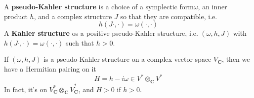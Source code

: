 \documentclass[
11pt, %
letterpaper， %
oneside, %
headinclude,footinclude, %
BCOR5mm, %
]{scrartcl}
\newcommand{\C}{{\mathbf{C}}}
\newcommand{\bfs}{\textbf}
\begin{document}
\begin{definition}
	A \bfs{pseudo-Kahler structure} is a choice of a symplectic form$\omega$, an inner product $h$, and a complex structure $J$ so that they are compatible, i.e.
	\begin{equation*}
	 h(J\cdot, \cdot)=\omega(\cdot,\cdot)
	\end{equation*}
	A \bfs{Kahler structure} os a positive pseudo-Kahler structure, i.e. $(\omega, h, J)$ with $h(J\cdot, \cdot)=\omega(\cdot,\cdot)$ such that $h>0$.
\end{definition}

\begin{rem}
	If $(\omega, h, J)$ is a pseudo-Kahler structure on a complex vector space $V_{\C}$, then we have a Hermitian pairing on it
	\begin{equation*}
	H=h-i\omega \in V^*\otimes_{\C}V^*
	\end{equation*}
	In fact, it's on $V_{\C}^*\otimes_{\C}\overline{V}_{\C}^*$, and $H>0$ if $h>0$.
\end{rem}
\end{document}
